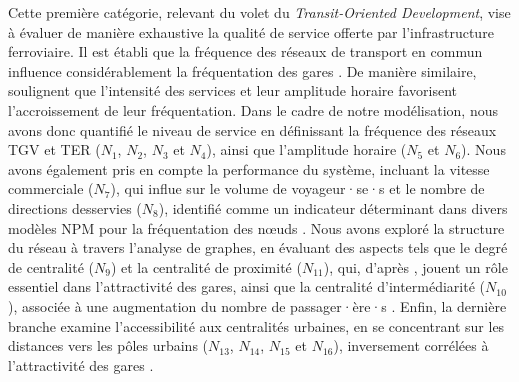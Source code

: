 \begin{refsegment}
Cette première catégorie, relevant du volet  du \textsl{Transit-Oriented Development}, vise à évaluer de manière exhaustive la qualité de service offerte par l'infrastructure ferroviaire. Il est établi que la fréquence des réseaux de transport en commun influence considérablement la fréquentation des gares \textcolor{blue}{\autocite[79]{sung_transit-oriented_2011}}. De manière similaire, \textcolor{blue}{\textcite[63]{kashfi_effects_2015}} soulignent que l'intensité des services et leur amplitude horaire favorisent l'accroissement de leur fréquentation. Dans le cadre de notre modélisation, nous avons donc quantifié le niveau de service en définissant la fréquence des réseaux \acrshort{TGV} et \acrshort{TER} (\(N_{1}\), \(N_{2}\), \(N_{3}\) et \(N_{4}\)), ainsi que l'amplitude horaire (\(N_{5}\) et \(N_{6}\)). Nous avons également pris en compte la performance du système, incluant la vitesse commerciale (\(N_{7}\)), qui influe sur le volume de voyageur·se·s \textcolor{blue}{\autocite[149-201]{vuchic_urban_2007}} et le nombre de directions desservies (\(N_{8}\)), identifié comme un indicateur déterminant dans divers modèles \acrshort{NPM} pour la fréquentation des nœuds \textcolor{blue}{\autocite[9]{cao_coordination_2020}}. Nous avons exploré la structure du réseau à travers l'analyse de graphes, en évaluant des aspects tels que le degré de centralité (\(N_{9}\)) et la centralité de proximité (\(N_{11}\)), qui, d'après \textcolor{blue}{\textcite[14]{shi_exploring_2018}}, jouent un rôle essentiel dans l'attractivité des gares, ainsi que la centralité d'intermédiarité (\(N_{10}\)), associée à une augmentation du nombre de passager·ère·s \textcolor{blue}{\autocite[339]{jang_influence_2022}}. Enfin, la dernière branche examine l'accessibilité aux centralités urbaines, en se concentrant sur les distances vers les pôles urbains (\(N_{13}\), \(N_{14}\), \(N_{15}\) et \(N_{16}\)), inversement corrélées à l'attractivité des gares \textcolor{blue}{\autocites[8]{liu_how_2016}[241]{kuby_factors_2004}}.%


\end{refsegment}
